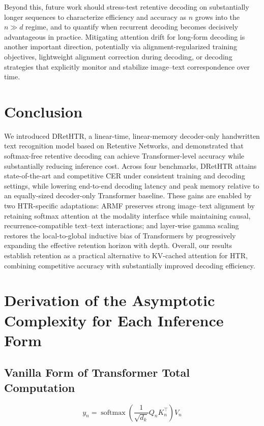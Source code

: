 \documentclass[times, review, 10pt]{elsarticle}
\begin{document}
Beyond this, future work should stress-test retentive decoding on substantially longer sequences to characterize efficiency and accuracy as $n$ grows into the $n \gg d$ regime, and to quantify when recurrent decoding becomes decisively advantageous in practice. Mitigating attention drift for long-form decoding is another important direction, potentially via alignment-regularized training objectives, lightweight alignment correction during decoding, or decoding strategies that explicitly monitor and stabilize image--text correspondence over time.

\section{Conclusion}
\label{sec:conclude}
We introduced DRetHTR, a linear-time, linear-memory decoder-only handwritten text recognition model based on Retentive Networks, and demonstrated that softmax-free retentive decoding can achieve Transformer-level accuracy while substantially reducing inference cost. Across four benchmarks, DRetHTR attains state-of-the-art and competitive CER under consistent training and decoding settings, while lowering end-to-end decoding latency and peak memory relative to an equally-sized decoder-only Transformer baseline. These gains are enabled by two HTR-specific adaptations: ARMF preserves strong image--text alignment by retaining softmax attention at the modality interface while maintaining causal, recurrence-compatible text--text interactions; and layer-wise gamma scaling restores the local-to-global inductive bias of Transformers by progressively expanding the effective retention horizon with depth. Overall, our results establish retention as a practical alternative to KV-cached attention for HTR, combining competitive accuracy with substantially improved decoding efficiency.

\appendix
\section{Derivation of the Asymptotic Complexity for Each Inference Form}
\label{supp:Asymptotic}
\subsection{Vanilla Form of Transformer Total Computation}

\begin{equation}
\label{eq:app-asym-vanilla-yn}
y_n = \operatorname{softmax}\left(\frac{1}{\sqrt{d_k}} Q_n K_n^{\top}\right) V_n
\end{equation}
\end{document}
